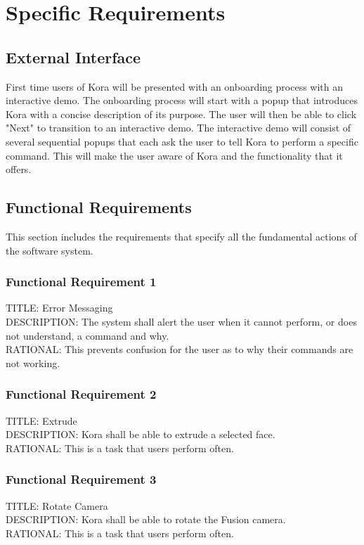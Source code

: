 \documentclass[onecolumn, draftclsnofoot,10pt, compsoc]{IEEEtran}
\def \botname{Kora }
\begin{document}
\section{Specific Requirements}
    \subsection{External Interface}
       First time users of \botname will be presented with an onboarding process with an interactive demo.
       The onboarding process will start with a popup that introduces \botname with a concise description of its purpose.
       The user will then be able to click "Next" to transition to an interactive demo.
       The interactive demo will consist of several sequential popups that each ask the user to tell \botname to perform a specific command.
       This will make the user aware of \botname and the functionality that it offers.

    \subsection{Functional Requirements}
    This section includes the requirements that specify all the fundamental actions of the software system.
        \subsubsection{Functional Requirement 1}
        TITLE: Error Messaging \\
        DESCRIPTION: The system shall alert the user when it cannot perform, or does not understand, a command and why. \\
        RATIONAL: This prevents confusion for the user as to why their commands are not working. 
        
        \subsubsection{Functional Requirement 2}
        TITLE: Extrude \\
        DESCRIPTION: \botname shall be able to extrude a selected face. \\
        RATIONAL: This is a task that users perform often.
        
        \subsubsection{Functional Requirement 3}
        TITLE: Rotate Camera \\
        DESCRIPTION: \botname shall be able to rotate the Fusion camera. \\
        RATIONAL: This is a task that users perform often.
        
\end{document}
